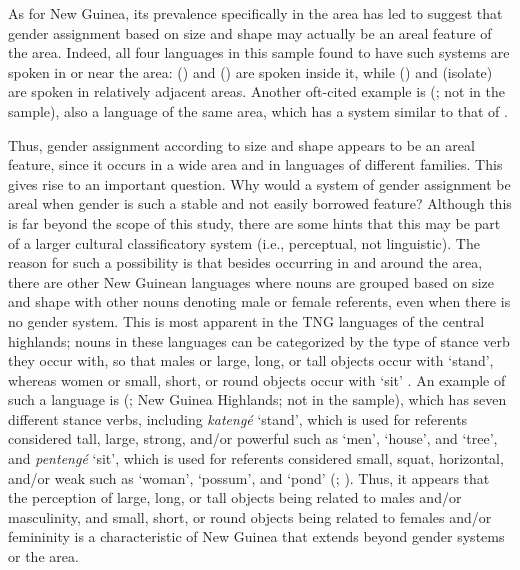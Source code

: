 \documentclass[output=collectionpaper]{langsci/langscibook}
\begin{document}
As for New Guinea, its prevalence specifically in the  area has led \citet[113]{Aikhenvald2008} to suggest that gender assignment based on size and shape may actually be an areal feature of the  area. Indeed, all four languages in this sample found to have such systems are spoken in or near the  area:  () and  () are spoken inside it, while  () and  (isolate) are spoken in relatively adjacent areas. Another oft-cited example is  (\citealt{Bruce1984}; not in the sample), also a  language of the same area, which has a system similar to that of  \citep[112]{Aikhenvald2008}.



Thus, gender assignment according to size and shape appears to be an areal feature, since it occurs in a wide area and in languages of different families. This gives rise to an important question. Why would a system of gender assignment be areal when gender is such a stable and not easily borrowed feature?  Although this is far beyond the scope of this study, there are some hints that this may be part of a larger cultural classificatory system (i.e., perceptual, not linguistic). The reason for such a possibility is that besides occurring in and around the  area, there are other New Guinean languages where nouns are grouped based on size and shape with other nouns denoting male or female referents, even when there is no gender system. This is most apparent in the TNG languages of the central highlands; nouns in these languages can be categorized by the type of stance verb they occur with, so that males or large, long, or tall objects occur with `stand', whereas women or small, short, or round objects occur with `sit'  \citep[372]{Foley2000}. An example of such a language is  (; New Guinea Highlands; not in the sample), which has seven different stance verbs, including \textit{katengé} `stand', which is used for referents considered tall, large, strong, and/or powerful such as `men', `house', and `tree', and \textit{pentengé} `sit', which is used for referents considered small, squat, horizontal, and/or weak such as `woman', `possum', and `pond' (\citealt[158--159]{Aikhenvald2000}; \citealt{Rumsey2002}). Thus, it appears that the perception of large, long, or tall objects being related to males and/or masculinity, and small, short, or round objects being related to females and/or femininity is a characteristic of New Guinea that extends beyond gender systems or the  area.
\end{document}
